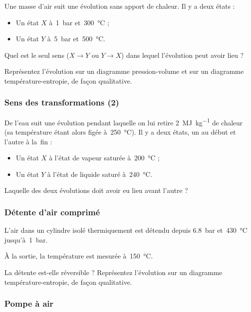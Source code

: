 	Une masse d’air suit une évolution sans apport de chaleur. Il y a deux états :
		\begin{itemize}
			\item Un état $X$ à~\SI{1}{\bar} et~\SI{300}{\degreeCelsius} ;
			\item Un état $Y$ à~\SI{5}{\bar} et~\SI{500}{\degreeCelsius}.
		\end{itemize}
		
	Quel est le seul sens ($X \to Y$ ou $Y \to X$) dans lequel l’évolution peut avoir lieu ?
	
	Représentez l’évolution sur un diagramme pression-volume et sur un diagramme température-entropie, de façon qualitative.

\subsubsection{Sens des transformations (2)}
\label{exo_sens_transfos_deux}

	De l’eau suit une évolution pendant laquelle on lui retire \SI{2}{\mega\joule\per\kilogram} de chaleur (sa température étant alors figée à~\SI{250}{\degreeCelsius}). Il y a deux états, un au début et l’autre à la~fin :
		\begin{itemize}
			\item Un état $X$ à l’état de vapeur saturée à~\SI{200}{\degreeCelsius} ;
			\item Un état $Y$ à l’état de liquide saturé à~\SI{240}{\degreeCelsius}.
		\end{itemize}
	Laquelle des deux évolutions doit avoir eu lieu avant l’autre ?

\subsubsection{Détente d’air comprimé}
\label{exo_detente_air_irreversible}

	L’air dans un cylindre isolé thermiquement est détendu depuis \SI{6,8}{\bar} et~\SI{430}{\degreeCelsius} jusqu’à~\SI{1}{\bar}.

	À la sortie, la température est mesurée à~\SI{150}{\degreeCelsius}.

	La détente est-elle réversible ? Représentez l’évolution sur un diagramme température-entropie, de façon qualitative.


\subsubsection{Pompe à air}
\label{exo_pompe_air}

